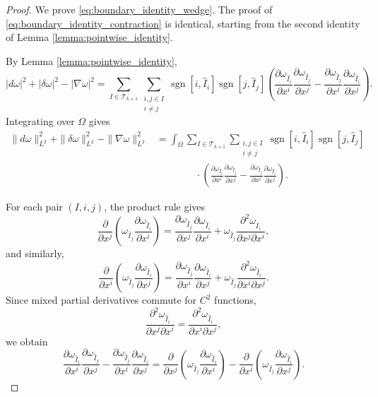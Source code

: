 \begin{proof}
We prove \eqref{eq:boundary_identity_wedge}. The proof of
\eqref{eq:boundary_identity_contraction} is identical, starting from the second
identity of Lemma \ref{lemma:pointwise_identity}.

By Lemma \ref{lemma:pointwise_identity},
\[
|d\omega|^2+|\delta\omega|^2-|\nabla\omega|^2
=
\sum_{I\in\mathscr T_{k+1}}
\sum_{\substack{i,j\in I\\ i\neq j}}
\operatorname{sgn}[i,\widehat I_i]
\operatorname{sgn}[j,\widehat I_j]
\left(
\frac{\partial\omega_{\widehat I_i}}{\partial x^i}
\frac{\partial\omega_{\widehat I_j}}{\partial x^j}
-
\frac{\partial\omega_{\widehat I_j}}{\partial x^i}
\frac{\partial\omega_{\widehat I_i}}{\partial x^j}
\right).
\]
Integrating over $\Omega$ gives
\begin{equation}
\label{eq:integrated_pointwise_identity}
\begin{aligned}
\|d\omega\|_{L^2}^2+\|\delta\omega\|_{L^2}^2-\|\nabla\omega\|_{L^2}^2
&=
\int_\Omega
\sum_{I\in\mathscr T_{k+1}}
\sum_{\substack{i,j\in I\\ i\neq j}}
\operatorname{sgn}[i,\widehat I_i]
\operatorname{sgn}[j,\widehat I_j] \\
&\qquad\qquad\cdot
\left(
\frac{\partial\omega_{\widehat I_i}}{\partial x^i}
\frac{\partial\omega_{\widehat I_j}}{\partial x^j}
-
\frac{\partial\omega_{\widehat I_j}}{\partial x^i}
\frac{\partial\omega_{\widehat I_i}}{\partial x^j}
\right).
\end{aligned}
\end{equation}

For each pair $(I,i,j)$, the product rule gives
\[
\frac{\partial}{\partial x^j}
\left(
\omega_{\widehat I_j}
\frac{\partial\omega_{\widehat I_i}}{\partial x^i}
\right)
=
\frac{\partial\omega_{\widehat I_j}}{\partial x^j}
\frac{\partial\omega_{\widehat I_i}}{\partial x^i}
+
\omega_{\widehat I_j}
\frac{\partial^2\omega_{\widehat I_i}}{\partial x^j\partial x^i},
\]
and similarly,
\[
\frac{\partial}{\partial x^i}
\left(
\omega_{\widehat I_j}
\frac{\partial\omega_{\widehat I_i}}{\partial x^j}
\right)
=
\frac{\partial\omega_{\widehat I_j}}{\partial x^i}
\frac{\partial\omega_{\widehat I_i}}{\partial x^j}
+
\omega_{\widehat I_j}
\frac{\partial^2\omega_{\widehat I_i}}{\partial x^i\partial x^j}.
\]
Since mixed partial derivatives commute for $C^2$ functions,
\[
\frac{\partial^2\omega_{\widehat I_i}}{\partial x^j\partial x^i}
=
\frac{\partial^2\omega_{\widehat I_i}}{\partial x^i\partial x^j},
\]
we obtain
\begin{equation}
\label{eq:divergence_identity}
\frac{\partial\omega_{\widehat I_i}}{\partial x^i}
\frac{\partial\omega_{\widehat I_j}}{\partial x^j}
-
\frac{\partial\omega_{\widehat I_j}}{\partial x^i}
\frac{\partial\omega_{\widehat I_i}}{\partial x^j}
=
\frac{\partial}{\partial x^j}
\left(
\omega_{\widehat I_j}
\frac{\partial\omega_{\widehat I_i}}{\partial x^i}
\right)
-
\frac{\partial}{\partial x^i}
\left(
\omega_{\widehat I_j}
\frac{\partial\omega_{\widehat I_i}}{\partial x^j}
\right).
\end{equation}


\end{proof}
